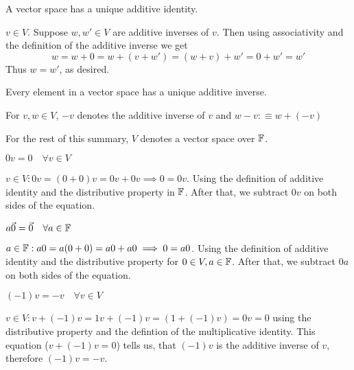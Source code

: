 \setcounter{thm}{25}
\begin{thm} 
  \label{thm: unique additive identity}
  A vector space has a unique additive identity.
\end{thm}
\begin{prf}
  $v\in V.$ Suppose $w,w' \in V$ are additive inverses of $v$. Then using associativity and the definition of the additive inverse we get
  \begin{equation}
    w = w + 0 = w + (v + w') = (w+v) + w' = 0 + w' = w'
  \end{equation}
  Thus $w = w'$, as desired.
\end{prf}

\begin{thm} 
  Every element in a vector space has a unique additive inverse.
\end{thm}

\begin{mydef}
  For $v,w\in V$, $-v$ denotes the additive inverse of $v$ and $w-v:\equiv w+(-v)$
\end{mydef}

\begin{mydef}
  For the rest of this summary, $V$ denotes a vector space over $\mathbb{F}$.
\end{mydef}

\begin{thm} 
  $0v = 0 \quad \forall v\in V$
\end{thm}
\begin{prf}
  $v \in V: 0v = (0+0)v = 0v +0v \implies 0 = 0v$. Using the definition of additive identity and the distributive property in $\mathbb{F}$. After that, we subtract $0v$ on both sides of the equation.
\end{prf}

\begin{thm} 
  $a \vec0= \vec0 \quad \forall a\in \mathbb{F}$
\end{thm}
\begin{prf}
  $a \in \mathbb{F}: a0 = a(0+0) = a0 + a0 \implies 0 = a0$. Using the definition of additive identity and the distributive property for $0 \in V, a \in \mathbb{F}$. After that, we subtract $0a$ on both sides of the equation.
\end{prf}

\begin{thm} 
  \label{thm: minus one times a vector}
  $(-1)v = -v \quad \forall v\in V$
\end{thm}
\begin{prf}
  $v \in V: v + (-1)v = 1v + (-1)v = (1 + (-1)v) = 0v = 0$ using the distributive property and the defintion of the multiplicative identity. This equation ($v+(-1)v=0$) tells us, that $(-1)v$ is the additive inverse of $v$, therefore $(-1)v = -v$.
\end{prf}
